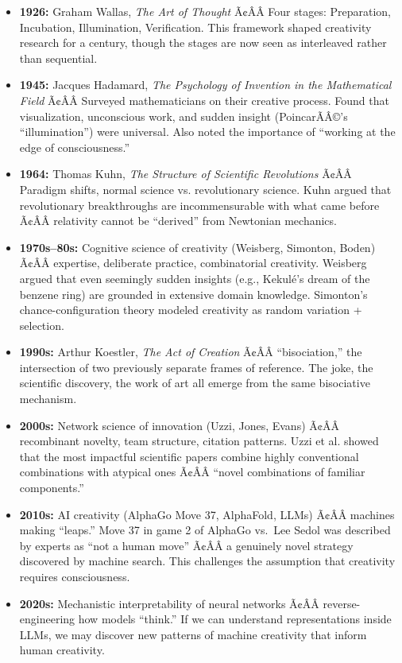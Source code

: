\begin{historicalbox}
\begin{itemize}
\item \textbf{1926:} Graham Wallas, \emph{The Art of Thought} Ã¢ÂÂ Four stages: Preparation, Incubation, Illumination, Verification. This framework shaped creativity research for a century, though the stages are now seen as interleaved rather than sequential.

\item \textbf{1945:} Jacques Hadamard, \emph{The Psychology of Invention in the Mathematical Field} Ã¢ÂÂ Surveyed mathematicians on their creative process. Found that visualization, unconscious work, and sudden insight (PoincarÃÂ©'s ``illumination'') were universal. Also noted the importance of ``working at the edge of consciousness.''

\item \textbf{1964:} Thomas Kuhn, \emph{The Structure of Scientific Revolutions} Ã¢ÂÂ Paradigm shifts, normal science vs. revolutionary science. Kuhn argued that revolutionary breakthroughs are incommensurable with what came before Ã¢ÂÂ relativity cannot be ``derived'' from Newtonian mechanics.

\item \textbf{1970s--80s:} Cognitive science of creativity (Weisberg, Simonton, Boden) Ã¢ÂÂ expertise, deliberate practice, combinatorial creativity. Weisberg argued that even seemingly sudden insights (e.g., Kekul\'e's dream of the benzene ring) are grounded in extensive domain knowledge. Simonton's chance-configuration theory modeled creativity as random variation + selection.

\item \textbf{1990s:} Arthur Koestler, \emph{The Act of Creation} Ã¢ÂÂ ``bisociation,'' the intersection of two previously separate frames of reference. The joke, the scientific discovery, the work of art all emerge from the same bisociative mechanism.

\item \textbf{2000s:} Network science of innovation (Uzzi, Jones, Evans) Ã¢ÂÂ recombinant novelty, team structure, citation patterns. Uzzi et al. showed that the most impactful scientific papers combine highly conventional combinations with atypical ones Ã¢ÂÂ ``novel combinations of familiar components.''

\item \textbf{2010s:} AI creativity (AlphaGo Move 37, AlphaFold, LLMs) Ã¢ÂÂ machines making ``leaps.'' Move 37 in game 2 of AlphaGo vs.\ Lee Sedol was described by experts as ``not a human move'' Ã¢ÂÂ a genuinely novel strategy discovered by machine search. This challenges the assumption that creativity requires consciousness.

\item \textbf{2020s:} Mechanistic interpretability of neural networks Ã¢ÂÂ reverse-engineering how models ``think.'' If we can understand representations inside LLMs, we may discover new patterns of machine creativity that inform human creativity.
\end{itemize}

\end{historicalbox}

